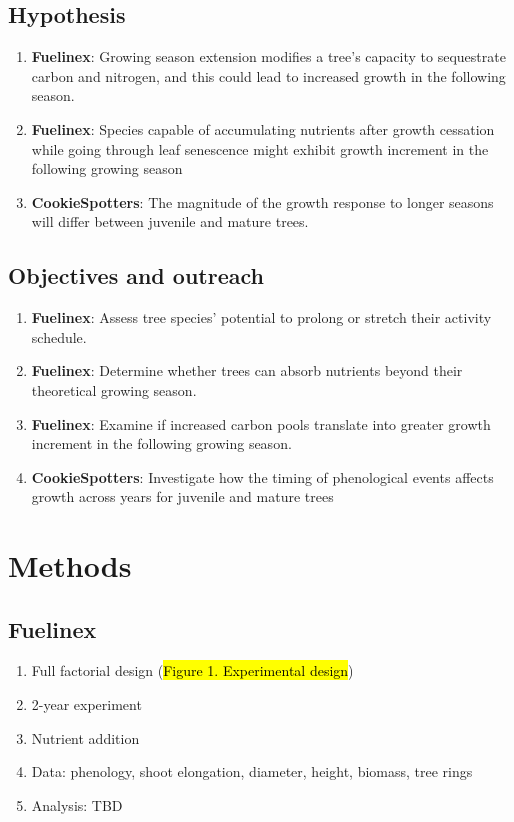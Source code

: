 \documentclass{article}
\begin{document}
\subsection{Hypothesis}
\begin {enumerate}
	\item \textbf{Fuelinex}: Growing season extension modifies a tree’s capacity to sequestrate carbon and nitrogen, and this could lead to increased growth in the following season.
	\item \textbf{Fuelinex}: Species capable of accumulating nutrients after growth cessation while going through leaf senescence might exhibit growth increment in the following growing season
	\item \textbf{CookieSpotters}: The magnitude of the growth response to longer seasons will differ between juvenile and mature trees.
\end {enumerate}

\subsection{Objectives and outreach}
\begin {enumerate}
	\item \textbf{Fuelinex}: Assess tree species’ potential to prolong or stretch their activity schedule.
	\item \textbf{Fuelinex}:  Determine whether trees can absorb nutrients beyond their theoretical growing season.
	\item \textbf{Fuelinex}:  Examine if increased carbon pools translate into greater growth increment in the following growing season. 
	\item \textbf{CookieSpotters}: Investigate how the timing of phenological events affects growth across years for juvenile and mature trees
\end {enumerate}

\section{Methods}

\subsection{Fuelinex}
\begin {enumerate}
	\item Full factorial design (\hl{Figure 1. Experimental design})
	\item 2-year experiment 
	\item Nutrient addition
	\item Data: phenology, shoot elongation, diameter, height, biomass, tree rings
	\item Analysis: TBD
\end {enumerate}
\end{document}
